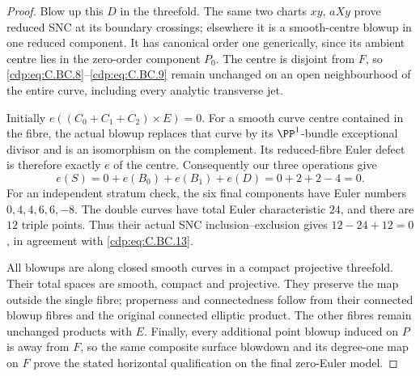 \begin{proof}
Blow up this \(D\) in the threefold. The same two
charts \(xy\), \(aXy\) prove reduced SNC at its
boundary crossings; elsewhere it is a smooth-centre
blowup in one reduced component. It has canonical
order one generically, since its ambient centre lies
in the zero-order component \(P_0\). The centre is
disjoint from \(F\), so \eqref{cdp:eq:C.BC.8}--\eqref{cdp:eq:C.BC.9} remain
unchanged on an open neighbourhood of the entire
curve, including every analytic transverse jet.

Initially \(e((C_0+C_1+C_2)\times E)=0\).
For a smooth curve centre contained in the fibre,
the actual blowup replaces that curve by its
\(\PP^1\)-bundle exceptional divisor and is an
isomorphism on the complement. Its reduced-fibre
Euler defect is therefore exactly \(e\) of the
centre. Consequently our three operations give
\[
             e(S)=0+e(B_0)+e(B_1)+e(D)
                         =0+2+2-4=0 .                       \tag{C.BC.13}\label{cdp:eq:C.BC.13}
\]
For an independent stratum check, the six final components
have Euler numbers \(0,4,4,6,6,-8\). The double curves
have total Euler characteristic \(24\), and there are
\(12\) triple points. Thus their actual SNC
inclusion--exclusion gives \(12-24+12=0\), in
agreement with \eqref{cdp:eq:C.BC.13}.

All blowups are along closed smooth curves in a
compact projective threefold. Their total spaces
are smooth, compact and projective. They preserve
the map outside the single fibre; properness and
connectedness follow from their connected blowup
fibres and the original connected elliptic product.
The other fibres remain unchanged products with
\(E\). Finally, every additional point blowup
induced on \(P\) is away from \(F\), so the
same composite surface blowdown and its degree-one
map on \(F\) prove the stated horizontal
qualification on the final zero-Euler model.
\end{proof}


